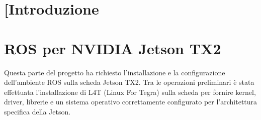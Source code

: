 \documentclass[a4paper]{article}
\begin{document}
\begin{frontespizio}

\end{frontespizio}
\tableofcontents
\newpage
\section{[Introduzione}
    

\section{ROS per NVIDIA Jetson TX2}
Questa parte del progetto ha richiesto l'installazione e la configurazione dell'ambiente ROS sulla scheda Jetson TX2.
Tra le operazioni preliminari è stata effettuata l'installazione di L4T (Linux For Tegra) sulla scheda per fornire kernel, driver, librerie e un sistema operativo
correttamente configurato per l'architettura specifica della Jetson.
\end{document}
